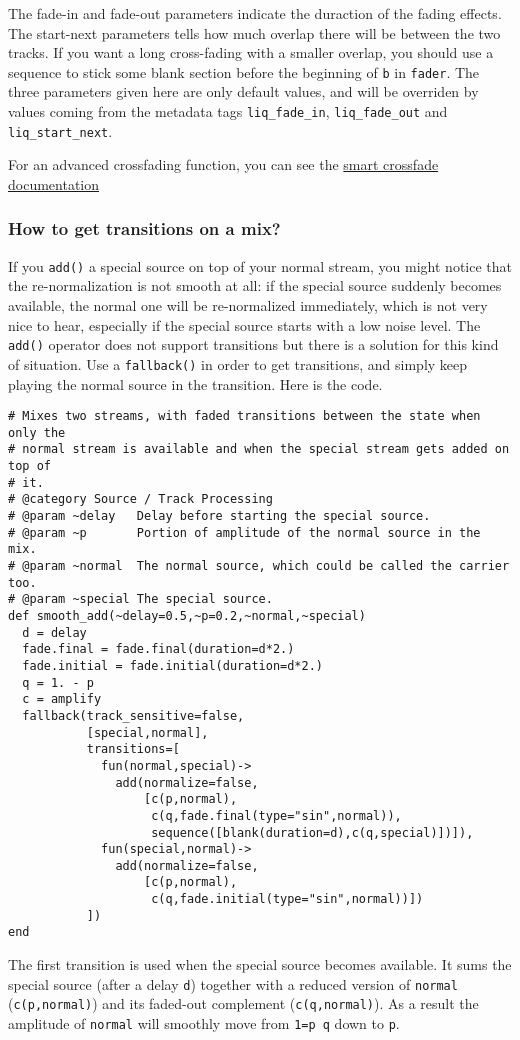 The fade-in and fade-out parameters indicate the duraction of the fading effects. The start-next parameters tells how much overlap there will be between the two tracks. If you want a long cross-fading with a smaller overlap, you should use a sequence to stick some blank section before the beginning of \verb+b+ in \verb+fader+.
The three parameters given here are only default values, and will be overriden by values coming from the metadata tags \verb+liq_fade_in+, \verb+liq_fade_out+ and \verb+liq_start_next+.

For an advanced crossfading function, you can see the \href{smartcrossfade.html}{smart crossfade documentation}

\subsubsection{How to get transitions on a mix?}
If you \verb+add()+ a special source on top of your normal stream, you might notice that the re-normalization is not smooth at all: if the special source suddenly becomes available, the normal one will be re-normalized immediately, which is not very nice to hear, especially if the special source starts with a low noise level. The \verb+add()+ operator does not support transitions but there is a solution for this kind of situation. Use a \verb+fallback()+ in order to get transitions, and simply keep playing the normal source in the transition. Here is the code.

\begin{verbatim}
# Mixes two streams, with faded transitions between the state when only the
# normal stream is available and when the special stream gets added on top of
# it.
# @category Source / Track Processing
# @param ~delay   Delay before starting the special source.
# @param ~p       Portion of amplitude of the normal source in the mix.
# @param ~normal  The normal source, which could be called the carrier too.
# @param ~special The special source.
def smooth_add(~delay=0.5,~p=0.2,~normal,~special)
  d = delay
  fade.final = fade.final(duration=d*2.)
  fade.initial = fade.initial(duration=d*2.)
  q = 1. - p
  c = amplify
  fallback(track_sensitive=false,
           [special,normal],
           transitions=[
             fun(normal,special)->
               add(normalize=false,
                   [c(p,normal),
                    c(q,fade.final(type="sin",normal)),
                    sequence([blank(duration=d),c(q,special)])]),
             fun(special,normal)->
               add(normalize=false,
                   [c(p,normal),
                    c(q,fade.initial(type="sin",normal))])
           ])
end
\end{verbatim}
The first transition is used when the special source becomes available. It sums the special source (after a delay \verb+d+) together with a reduced version of \verb+normal+ (\verb+c(p,normal)+) and its faded-out complement (\verb+c(q,normal)+). As a result the amplitude of \verb+normal+ will smoothly move from \verb+1=p q+ down to \verb+p+.

